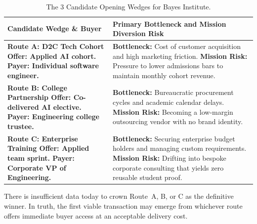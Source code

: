 \begin{table}[htbp]
\centering
\begin{tcolorbox}[
  enhanced,
  colback=white,
  colframe=BayesBorder!80!white,
  boxrule=0.4pt,
  arc=2pt,
  left=3pt,right=3pt,top=3pt,bottom=3pt,
  before skip=3pt,after skip=4pt
]
\scriptsize
\setlength{\tabcolsep}{3pt}
\renewcommand{\arraystretch}{1.18}
\begin{tabularx}{\linewidth}{@{} >{\bfseries\color{BayesInk}}p{2.3cm} >{\color{BayesInk}}X @{}}
\toprule
\textbf{Candidate Wedge \& Buyer} & \textbf{Primary Bottleneck and Mission Diversion Risk} \\
\midrule
Route A: D2C Tech Cohort\newline
\textbf{Offer:} Applied AI cohort.\newline
\textbf{Payer:} Individual software engineer. & 
\textbf{Bottleneck:} Cost of customer acquisition and high marketing friction.\newline
\textbf{Mission Risk:} Pressure to lower admissions bars to maintain monthly cohort revenue. \\
\midrule
Route B: College Partnership\newline
\textbf{Offer:} Co-delivered AI elective.\newline
\textbf{Payer:} Engineering college trustee. & 
\textbf{Bottleneck:} Bureaucratic procurement cycles and academic calendar delays.\newline
\textbf{Mission Risk:} Becoming a low-margin outsourcing vendor with no brand identity. \\
\midrule
Route C: Enterprise Training\newline
\textbf{Offer:} Applied team sprint.\newline
\textbf{Payer:} Corporate VP of Engineering. & 
\textbf{Bottleneck:} Securing enterprise budget holders and managing custom requirements.\newline
\textbf{Mission Risk:} Drifting into bespoke corporate consulting that yields zero reusable student proof. \\
\bottomrule
\end{tabularx}
\end{tcolorbox}
\caption{The 3 Candidate Opening Wedges for Bayes Institute.}
\label{tab:bayes-routes}
\end{table}

There is insufficient data today to crown Route~A, B, or C as the definitive winner. In truth, the first viable transaction may emerge from whichever route offers immediate buyer access at an acceptable delivery cost.

